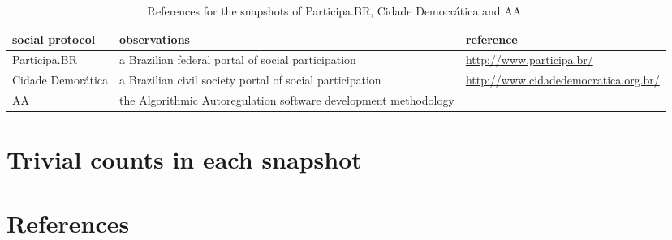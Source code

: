 \documentclass[review]{elsarticle}
\begin{document}
\begin{table*}[h!]\scriptsize
\begin{center}
\caption{References for the snapshots of
Participa.BR, Cidade Democrática and AA.}\label{tab:provenance}
\begin{tabular}{| l || p{4cm} | p{3cm} | }\hline
    \textbf{social protocol} & \textbf{observations} & \textbf{reference} \\\hline\hline
    Participa.BR & a Brazilian federal portal of social participation & \url{http://www.participa.br/} \\\hline
    Cidade Demorática & a Brazilian civil society portal of social participation & \url{http://www.cidadedemocratica.org.br/} \\\hline
    AA & the Algorithmic Autoregulation software development methodology & \cite{aarticle,aa2} \\\hline
\end{tabular}\end{center}
\end{table*}                    


\clearpage
\section{Trivial counts in each snapshot}





\clearpage


\section*{References}

%

%
%
\end{document}

